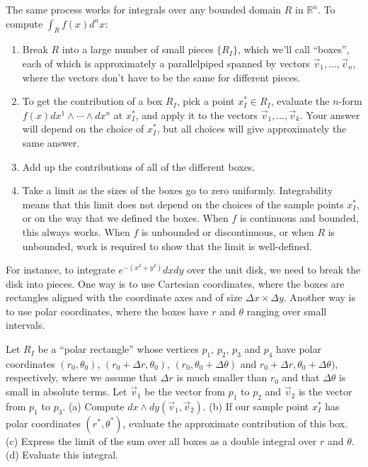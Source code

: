 \documentclass[12pt]{amsbook}
\newcommand{\R}{{\mathbb R}}
\theoremstyle{definition}
\begin{document}
The same process works for integrals over any bounded domain $R$ in $\R^n$.
To compute $\int_R f(x) d^nx$:
\begin{enumerate}
\item Break $R$ into a large number of small pieces $\{ R_I\}$, which we'll
call ``boxes'', 
each of which is 
approximately a parallelpiped spanned by vectors $\vec v_1,\ldots, \vec v_n$,
where the vectors don't have to be the same for different pieces.
\item To get the contribution of a box $R_I$, pick a point $x_I^* \in R_I$,
evaluate the $n$-form $f(x) dx^1\wedge\cdots\wedge dx^n$ at $x_I^*$, and
apply it to the vectors $\vec v_1, \ldots, \vec v_k$. Your answer will
depend on the choice of $x_I^*$, but all choices will give approximately the
same answer. 
\item Add up the contributions of all of the different boxes. 
\item Take a limit as the sizes of the boxes go to zero uniformly. Integrability
means that this limit does not depend on the choices of the sample points 
$x_I^*$, or on the way that we defined the boxes. When $f$ is continuous and
bounded, this always works. When $f$ is unbounded or discontinuous, or when
$R$ is unbounded, work is required to show that the limit is well-defined.
\end{enumerate}

For instance, to integrate $e^{-(x^2+y^2)}dx dy$ over the unit disk, we need
to break the disk into pieces. One way is to use Cartesian coordinates, where
the boxes are rectangles aligned with the coordinate axes and of size 
$\Delta x \times \Delta y$. Another way is to use polar coordinates, where 
the boxes have $r$ and $\theta$ ranging over small intervals. 

 Let $R_I$ be
a ``polar rectangle'' whose vertices $p_1$, $p_2$, $p_3$ and $p_4$ 
have polar coordinates $(r_0,\theta_0)$,
$(r_0+\Delta r, \theta_0)$, $(r_0, \theta_0+\Delta \theta)$ and 
$r_0+\Delta r, \theta_0+\Delta \theta)$, respectively, 
where we assume that $\Delta r$ is
much smaller than $r_0$ and that $\Delta \theta$ is small in absolute terms.
Let $\vec v_1$ be the vector from $p_1$ to $p_2$ and $\vec v_2$ is the vector
from $p_1$ to $p_3$. \newline
(a) Compute $dx \wedge dy (\vec v_1, \vec v_2)$. \newline
(b) If our sample point $x_I^*$ has polar coordinates $(r^*, \theta^*)$, 
evaluate the approximate contribution of this box. \newline
(c) Express the limit of the sum over all boxes as a double integral over
$r$ and $\theta$. \newline
(d) Evaluate this integral. 
\end{document}
